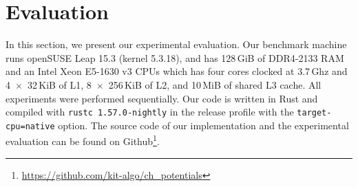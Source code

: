 \documentclass[manuscript,review]{acmart}
\begin{document}



\section{Evaluation}
\label{sec:experiments}

In this section, we present our experimental evaluation.
Our benchmark machine runs openSUSE Leap 15.3 (kernel 5.3.18), and has 128\,GiB of DDR4-2133 RAM and an Intel Xeon E5-1630 v3 CPUs which has four cores clocked at 3.7\,Ghz and 4~$\times$~32\,KiB of L1, 8~$\times$~256\,KiB of L2, and 10\,MiB of shared L3 cache.
All experiments were performed sequentially.
Our code is written in Rust and compiled with \texttt{rustc 1.57.0-nightly} in the release profile with the \texttt{target-cpu=native} option.
The source code of our implementation and the experimental evaluation can be found on Github\footnote{\url{https://github.com/kit-algo/ch_potentials}}.
\end{document}
